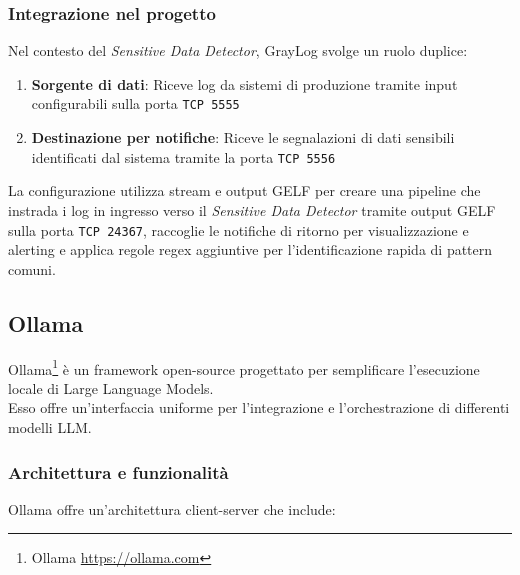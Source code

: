 \documentclass[12pt]{report}
\begin{document}
\subsubsection{Integrazione nel progetto}
Nel contesto del \textit{Sensitive Data Detector}, GrayLog svolge un ruolo duplice:

\begin{enumerate}
    \item \textbf{Sorgente di dati}: Riceve log da sistemi di produzione tramite input configurabili sulla porta \texttt{TCP 5555}
    \item \textbf{Destinazione per notifiche}: Riceve le segnalazioni di dati sensibili identificati dal sistema tramite la porta \texttt{TCP 5556}
\end{enumerate}

La configurazione utilizza stream e output GELF per creare una pipeline che instrada i log in ingresso verso il \textit{Sensitive Data Detector} tramite output GELF sulla porta \texttt{TCP 24367}, raccoglie le notifiche di ritorno per visualizzazione e alerting e applica regole regex aggiuntive per l'identificazione rapida di pattern comuni.

\subsection{Ollama}
\label{subsec:ollama}

Ollama\footnote{Ollama \url{https://ollama.com}} è un framework open-source progettato per semplificare l'esecuzione locale di Large Language Models.\\
Esso offre un'interfaccia uniforme per l'integrazione e l'orchestrazione di differenti modelli LLM.

\subsubsection{Architettura e funzionalità}
Ollama offre un'architettura client-server che include:
\end{document}
